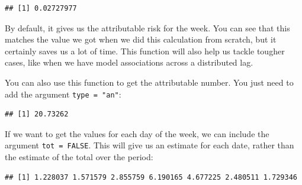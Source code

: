\documentclass[
]{book}
\newenvironment{Shaded}{\begin{snugshade}}{\end{snugshade}}
\newcommand{\DataTypeTok}[1]{\textcolor[rgb]{0.13,0.29,0.53}{#1}}
\newcommand{\DecValTok}[1]{\textcolor[rgb]{0.00,0.00,0.81}{#1}}
\newcommand{\KeywordTok}[1]{\textcolor[rgb]{0.13,0.29,0.53}{\textbf{#1}}}
\newcommand{\NormalTok}[1]{#1}
\newcommand{\OperatorTok}[1]{\textcolor[rgb]{0.81,0.36,0.00}{\textbf{#1}}}
\newcommand{\OtherTok}[1]{\textcolor[rgb]{0.56,0.35,0.01}{#1}}
\newcommand{\StringTok}[1]{\textcolor[rgb]{0.31,0.60,0.02}{#1}}
\begin{document}
\begin{verbatim}
## [1] 0.02727977
\end{verbatim}

By default, it gives us the attributable risk for the week. You can see that this matches the value we got when we did this calculation from scratch, but it certainly saves us a lot of time. This function will also help us tackle tougher cases, like when we have model associations across a distributed lag.

You can also use this function to get the attributable number. You just need to add the argument \texttt{type\ =\ "an"}:

\begin{Shaded}
\end{Shaded}

\begin{verbatim}
## [1] 20.73262
\end{verbatim}

If we want to get the values for each day of the week, we can include the argument \texttt{tot\ =\ FALSE}. This will give us an estimate for each date, rather than the estimate of the total over the period:

\begin{Shaded}
\end{Shaded}

\begin{verbatim}
## [1] 1.228037 1.571579 2.855759 6.190165 4.677225 2.480511 1.729346
\end{verbatim}
\end{document}
